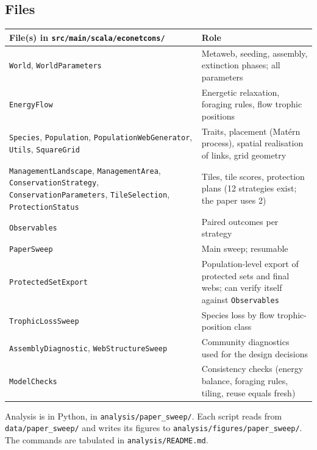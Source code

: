 \documentclass[11pt,a4paper]{article}
\newcommand{\code}[1]{\texttt{\small #1}}
\begin{document}
\subsection{Files}
\begin{table}[H]
\small
\begin{tabularx}{\textwidth}{@{}>{\raggedright\arraybackslash}p{5.6cm}L@{}}
\toprule
File(s) in \code{src/main/scala/econetcons/} & Role \\
\midrule
\code{World}, \code{WorldParameters} & Metaweb, seeding, assembly, extinction phases; all parameters \\
\code{EnergyFlow} & Energetic relaxation, foraging rules, flow trophic positions \\
\code{Species}, \code{Population}, \code{PopulationWebGenerator}, \code{Utils}, \code{SquareGrid} &
Traits, placement (Mat\'ern process), spatial realisation of links, grid geometry \\
\code{ManagementLandscape}, \code{ManagementArea}, \code{ConservationStrategy},
\code{ConservationParameters}, \code{TileSelection}, \code{ProtectionStatus} & Tiles, tile scores,
protection plans (12 strategies exist; the paper uses 2) \\
\code{Observables} & Paired outcomes per strategy \\
\code{PaperSweep} & Main sweep; resumable \\
\code{ProtectedSetExport} & Population-level export of protected sets and final webs; can verify itself
against \code{Observables} \\
\code{TrophicLossSweep} & Species loss by flow trophic-position class \\
\code{AssemblyDiagnostic}, \code{WebStructureSweep} & Community diagnostics used for the design decisions \\
\code{ModelChecks} & Consistency checks (energy balance, foraging rules, tiling, reuse equals fresh) \\
\bottomrule
\end{tabularx}
\end{table}

Analysis is in Python, in \code{analysis/paper\_sweep/}. Each script reads from
\code{data/paper\_sweep/} and writes its figures to \code{analysis/figures/paper\_sweep/}. The commands
are tabulated in \code{analysis/README.md}.
\end{document}
